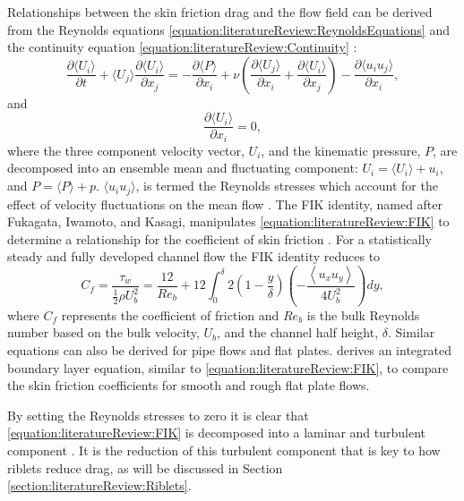 \documentclass[12pt,oneside,a4paper]{article}
\newcommand{\pdev}[2]{\frac{\partial {#1}}{\partial {#2}}}
\begin{document}
Relationships between the skin friction drag and the flow field can be derived from the Reynolds equations \eqref{equation:literatureReview:ReynoldsEquations} and the continuity equation \eqref{equation:literatureReview:Continuity} \citep{pope2001}:
\begin{equation}
\pdev{\langle U_i \rangle}{t} + \langle U_j \rangle \pdev{\langle U_i \rangle}{x_j}
=
-\pdev{\langle P \rangle}{x_i}
+
\nu
	\left(
	\pdev{\langle U_j \rangle}{x_i}
	+
	\pdev{\langle U_i \rangle}{x_j} 
	\right)
-
\pdev{\langle u_i u_j\rangle}{x_i},
\label{equation:literatureReview:ReynoldsEquations}
\end{equation}
and 
\begin{equation}
\pdev{\langle U_i \rangle}{x_i}
=
0,
\label{equation:literatureReview:Continuity}
\end{equation}
where the three component velocity vector, $U_i$, and the kinematic pressure, $P$, are decomposed into an ensemble mean and fluctuating component: $U_i = \langle U_i \rangle + u_i$, and $P = \langle P \rangle + p$. $\langle u_i u_j \rangle$, is termed the Reynolds stresses which account for the effect of velocity fluctuations on the mean flow \citep{pope2001}. The FIK identity, named after Fukagata, Iwamoto, and Kasagi, manipulates \eqref{equation:literatureReview:FIK} to determine a relationship for the coefficient of skin friction \citep{fukagata2002}. For a statistically steady and fully developed channel flow the FIK identity reduces to
\begin{equation}
\label{equation:literatureReview:FIK}
C_f = \frac{\tau_w}{\frac{1}{2} \rho U_b^2} = \frac{12}{Re_b} + 12 \int_0^\delta 2 \left(1 - \frac{y}{\delta} \right)\left( - \frac{\left< u_x u_y \right> }{4 U_b^2} \right) dy,
\end{equation}
where $C_f$ represents the coefficient of friction and $Re_b$ is the bulk Reynolds number based on the bulk velocity, $U_b$, and the channel half height, $\delta$. Similar equations can also be derived for pipe flows and flat plates. \cite{newhall2006} derives an integrated boundary layer equation, similar to \eqref{equation:literatureReview:FIK}, to compare the skin friction coefficients for smooth and rough flat plate flows. 

By setting the Reynolds stresses to zero it is clear that \eqref{equation:literatureReview:FIK} is decomposed into a laminar and turbulent component \citep{kasagi2006}. It is the reduction of this turbulent component that is key to how riblets reduce drag, as will be discussed in Section \ref{section:literatureReview:Riblets}.
\end{document}
